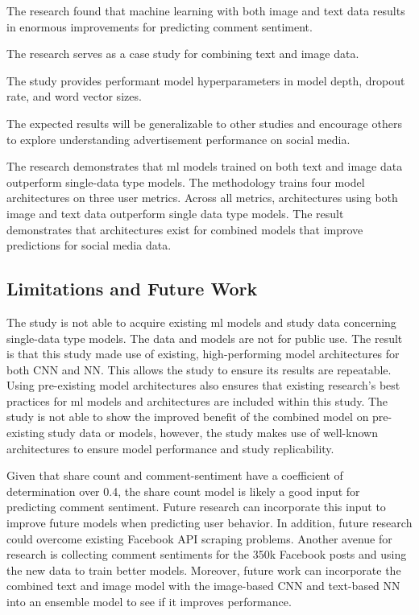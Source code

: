 \documentclass{article}
\begin{document}
The research found that machine learning with both image and text data results in enormous improvements for predicting comment sentiment.

The research serves as a case study for combining text and image data.

The study provides performant model hyperparameters in model depth, dropout rate, and word vector sizes.

The expected results will be generalizable to other studies and encourage others to explore understanding advertisement performance on social media.


The research demonstrates that ml models trained on both text and image data outperform single-data type models. The methodology trains four model architectures on three user metrics.  Across all metrics, architectures using both image and text data outperform single data type models. The result demonstrates that architectures exist for combined models that improve predictions for social media data.

\subsection{Limitations and Future Work}

The study is not able to acquire existing ml models and study data concerning single-data type models. The data and models are not for public use. The result is that this study made use of existing, high-performing model architectures for both CNN and NN. This allows the study to ensure its results are repeatable. Using pre-existing model architectures also ensures that existing research's best practices for ml models and architectures are included within this study. The study is not able to show the improved benefit of the combined model on pre-existing study data or models, however, the study makes use of well-known architectures to ensure model performance and study replicability. 

Given that share count and comment-sentiment have a coefficient of determination over 0.4, the share count model is likely a good input for predicting comment sentiment. Future research can incorporate this input to improve future models when predicting user behavior. In addition, future research could overcome existing Facebook API scraping problems. Another avenue for research is collecting comment sentiments for the 350k Facebook posts and using the new data to train better models.  Moreover, future work can incorporate the combined text and image model with the image-based CNN and text-based NN into an ensemble model to see if it improves performance.
\end{document}
